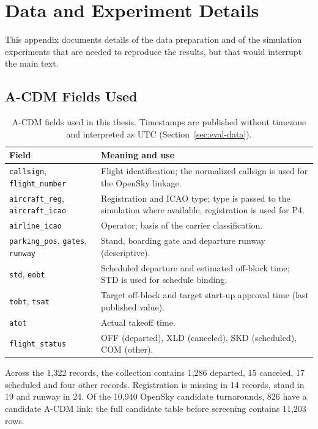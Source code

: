 \chapter{Data and Experiment Details}
\label{app:details}

This appendix documents details of the data preparation and of the simulation experiments that are needed to reproduce the results, but that would interrupt the main text.

\section{A-CDM Fields Used}

\begin{table}[htbp]\centering\small
\begin{tabular}{lp{8.5cm}}\hline
Field & Meaning and use\\\hline
\texttt{callsign}, \texttt{flight\_number} & Flight identification; the normalized callsign is used for the OpenSky linkage.\\
\texttt{aircraft\_reg}, \texttt{aircraft\_icao} & Registration and ICAO type; type is passed to the simulation where available, registration is used for P4.\\
\texttt{airline\_icao} & Operator; basis of the carrier classification.\\
\texttt{parking\_pos}, \texttt{gates}, \texttt{runway} & Stand, boarding gate and departure runway (descriptive).\\
\texttt{std}, \texttt{eobt} & Scheduled departure and estimated off-block time; STD is used for schedule binding.\\
\texttt{tobt}, \texttt{tsat} & Target off-block and target start-up approval time (last published value).\\
\texttt{atot} & Actual takeoff time.\\
\texttt{flight\_status} & OFF (departed), XLD (canceled), SKD (scheduled), COM (other).\\\hline
\end{tabular}
\caption{A-CDM fields used in this thesis. Timestamps are published without timezone and interpreted as UTC (Section~\ref{sec:eval-data}).}
\end{table}

Across the 1,322 records, the collection contains 1,286 departed, 15 canceled, 17 scheduled and four other records. Registration is missing in 14 records, stand in 19 and runway in 24. Of the 10,940 OpenSky candidate turnarounds, 826 have a candidate A-CDM link; the full candidate table before screening contains 11,203 rows.

